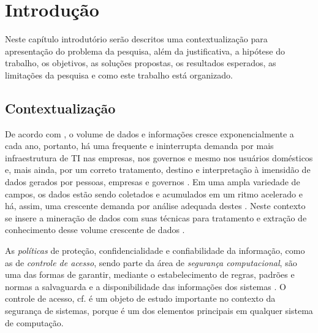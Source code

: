 \documentclass[
	12pt,				%
	openright,			%
	oneside,			%
	a4paper,			%
	english,			%
	french,				%
	spanish,			%
	brazil				%
	]{abntex2}
\begin{document}

\tableofcontents*
\cleardoublepage


\textual

\chapter{Introdução} \label{introducao}
Neste capítulo introdutório serão descritos uma contextualização para apresentação do problema da pesquisa, além da justificativa, a hipótese do trabalho, os objetivos, as soluções propostas, os resultados esperados, as limitações da pesquisa e como este trabalho está organizado.
\section{Contextualização} \label{contextualizacao}
De acordo com , o volume de dados e informações cresce exponencialmente a cada ano, portanto, há uma frequente e ininterrupta demanda por mais infraestrutura de TI nas empresas, nos governos e mesmo nos usuários domésticos e, mais ainda, por um correto tratamento, destino e interpretação à imensidão de dados gerados por pessoas, empresas e governos \cite{machado2014}. Em uma ampla variedade de campos, os dados estão sendo coletados e acumulados em um ritmo acelerado e há, assim, uma crescente demanda por análise adequada destes \cite{fayyad1996, lima_fraud_2012}. Neste contexto se insere a mineração de dados com suas técnicas para tratamento e extração de conhecimento desse volume crescente de dados \cite{Boscarioli2017, ferrari2017}.

As \textit{políticas} de proteção, confidencialidade e confiabilidade da informação, como as de \textit{controle de acesso}, sendo parte da área de \textit{segurança computacional}, são uma das formas de garantir, mediante o estabelecimento de regras, padrões e normas a salvaguarda e a disponibilidade das informações dos sistemas \cite{bui_efficient_2019}. O controle de acesso, cf.  é um objeto de estudo importante no contexto da segurança de sistemas, porque é um dos elementos principais em qualquer sistema de computação.
\end{document}
